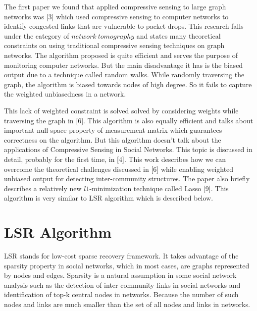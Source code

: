 \documentclass{article}
\begin{document}
The first paper we found that applied compressive sensing to large graph networks was [3] which used compressive sensing
to computer networks to identify congested links that are vulnerable to packet drops. This research falls under the
category of $network\ tomography$ and states many theoretical constraints on using traditional compressive sensing
techniques on graph networks. The algorithm proposed is quite efficient and serves the purpose of monitoring computer
networks. But the main disadvantage it has is the biased output due to a technique called random walks. While randomly
traversing the graph, the algorithm is biased towards nodes of high degree. So it fails to capture the weighted
unbiasedness in a network.

This lack of weighted constraint is solved solved by considering weights while traversing the graph in [6]. This
algorithm is also equally efficient and talks about important null-space property of measurement matrix which guarantees
correctness on the algorithm. But this algorithm doesn't talk about the applications of Compressive Sensing in Social
Networks. This topic is discussed in detail, probably for the first time, in [4]. This work describes how we can
overcome the theoretical challenges discussed in [6] while enabling weighted unbiased output for detecting
inter-community structures. The paper also briefly describes a relatively new $l1$-minimization technique called Lasso
[9]. This algorithm is very similar to LSR algorithm which is described below.  
\section{LSR Algorithm}
LSR stands for low-cost sparse recovery framework. It takes advantage of the sparsity property in social networks, which in most cases, are graphs represented by nodes and edges. Sparsity is a natural assumption in some social network analysis such as the detection of inter-community links in social networks and identification of top-k central nodes in networks. Because the number of such nodes and links are much smaller than the set of all nodes and links in networks.
\end{document}
